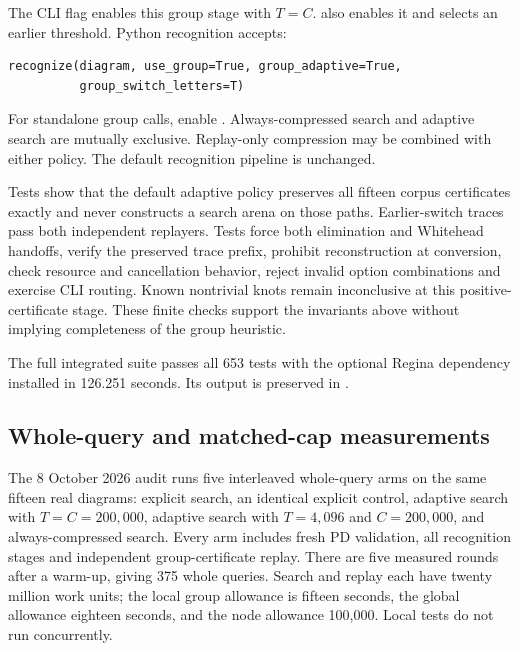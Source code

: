 The CLI flag  enables this group stage with $T=C$.
 also enables it and selects an earlier
threshold. Python recognition accepts:
\begin{verbatim}
recognize(diagram, use_group=True, group_adaptive=True,
          group_switch_letters=T)
\end{verbatim}
For standalone group calls, enable .
Always-compressed search and
adaptive search are mutually exclusive. Replay-only compression may be
combined with either policy. The default recognition pipeline is unchanged.

Tests show that the default adaptive policy preserves all fifteen corpus
certificates exactly and never constructs a search arena on those paths.
Earlier-switch traces pass both independent replayers. Tests force both
elimination and Whitehead handoffs, verify the preserved trace prefix,
prohibit reconstruction at conversion, check resource and cancellation
behavior, reject invalid option combinations and exercise CLI routing.
Known nontrivial knots remain inconclusive at this positive-certificate
stage. These finite checks support the invariants above without implying
completeness of the group heuristic.

The full integrated suite passes all 653 tests with the optional Regina
dependency installed in 126.251 seconds. Its output is preserved in
.

\subsection{Whole-query and matched-cap measurements}

The 8 October 2026 audit runs five interleaved whole-query arms on the same
fifteen real diagrams: explicit search, an identical explicit control,
adaptive search with $T=C=200{,}000$, adaptive search with $T=4{,}096$ and
$C=200{,}000$, and always-compressed search. Every arm includes fresh PD
validation, all recognition stages and independent group-certificate replay.
There are five measured rounds after a warm-up, giving 375 whole queries.
Search and replay each have twenty million work units; the local group
allowance is fifteen seconds, the global allowance eighteen seconds,
and the node allowance 100,000. Local tests do not run concurrently.

